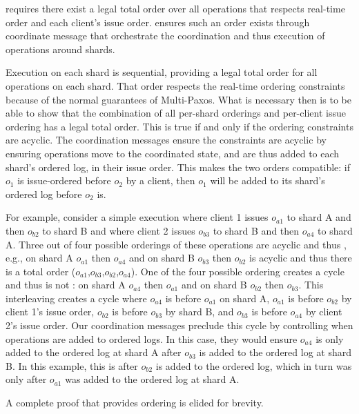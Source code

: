 \Mdl{} requires there exist a legal total order over all operations that respects real-time order and each client's issue order.
\sys{} ensures such an order exists through coordinate message that orchestrate the coordination and thus execution of operations around shards.

Execution on each shard is sequential, providing a legal total order for all operations on each shard.
That order respects the real-time ordering constraints because of the normal guarantees of Multi-Paxos.
What is necessary then is to be able to show that the combination of all per-shard orderings and per-client issue ordering has a legal total order.
This is true if and only if the ordering constraints are acyclic.
The coordination messages ensure the constraints are acyclic by ensuring operations move to the coordinated state, and are thus added to each shard's ordered log, in their issue order.
This makes the two orders compatible: if $o_1$ is issue-ordered before $o_2$ by a client, then $o_1$ will be added to its shard's ordered log before $o_2$ is.

For example, consider a simple execution where client 1 issues $o_{a1}$ to shard A and then $o_{b2}$ to shard B and where client 2 issues $o_{b3}$ to shard B and then $o_{a4}$ to shard A.
Three out of four possible orderings of these operations are acyclic and thus \mdl{},
e.g., on shard A $o_{a1}$ then $o_{a4}$ and on shard B $o_{b3}$ then $o_{b2}$ is acyclic and thus there is a total order ($o_{a1}$,$o_{b3}$,$o_{b2}$,$o_{a4}$).
One of the four possible ordering creates a cycle and thus is not \mdl{}:
on shard A $o_{a4}$ then $o_{a1}$ and on shard B $o_{b2}$ then $o_{b3}$.
This interleaving creates a cycle where $o_{a4}$ is before $o_{a1}$ on shard A, $o_{a1}$ is before $o_{b2}$ by client 1's issue order, $o_{b2}$ is before $o_{b3}$ by shard B, and $o_{b3}$ is before $o_{a4}$ by client 2's issue order.
Our coordination messages preclude this cycle by controlling when operations are added to ordered logs.
In this case, they would ensure $o_{a4}$ is only added to the ordered log at shard A after $o_{b3}$ is added to the ordered log at shard B. In this example, this is after $o_{b2}$ is added to the ordered log, which in turn was only after $o_{a1}$ was added to the ordered log at shard A.

A complete proof that \sys{} provides \Mdl{} ordering is elided for brevity.



